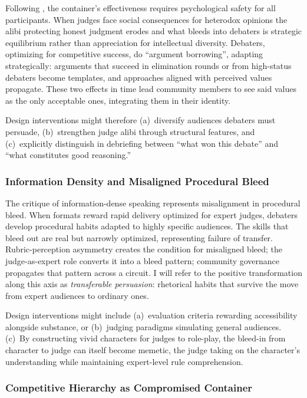 Following \textcite{bowman2025transformative}, the container's effectiveness requires psychological safety for all participants. When judges face social consequences for heterodox opinions the alibi protecting honest judgment erodes and what bleeds into debaters is strategic equilibrium rather than appreciation for intellectual diversity. Debaters, optimizing for competitive success, do ``argument borrowing'', adapting strategically: arguments that succeed in elimination rounds or from high-status debaters become templates, and approaches aligned with perceived values propagate. These two effects in time lead community members to see said values as the only acceptable ones, integrating them in their identity. 

Design interventions might therefore (a)~diversify audiences debaters must persuade, (b)~strengthen judge alibi through structural features, and (c)~explicitly distinguish in debriefing between ``what won this debate'' and ``what constitutes good reasoning.''

\subsubsection{Information Density and Misaligned Procedural Bleed}

The critique of information-dense speaking represents misalignment in procedural bleed. When formats reward rapid delivery optimized for expert judges, debaters develop procedural habits adapted to highly specific audiences. The skills that bleed out are real but narrowly optimized, representing failure of transfer. Rubric-perception asymmetry creates the condition for misaligned bleed; the judge-as-expert role converts it into a bleed pattern; community governance propagates that pattern across a circuit. I will refer to the positive transformation along this axis as \textit{transferable persuasion}: rhetorical habits that survive the move from expert audiences to ordinary ones.

Design interventions might include (a)~evaluation criteria rewarding accessibility alongside substance, or (b)~judging paradigms simulating general audiences. (c)~By constructing vivid characters for judges to role-play, the bleed-in from character to judge can itself become memetic, the judge taking on the character's understanding while maintaining expert-level rule comprehension.

\subsubsection{Competitive Hierarchy as Compromised Container}


